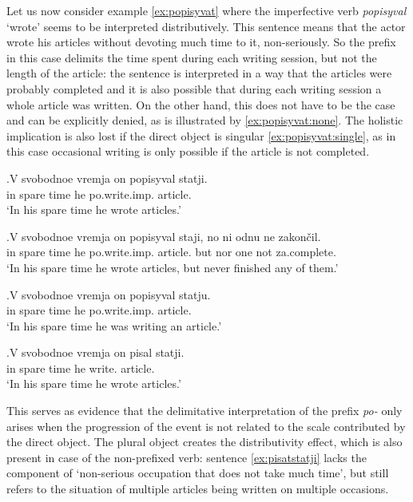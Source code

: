 Let us now consider example \ref{ex:popisyvat} where the imperfective verb  \textit{popisyval} `wrote' seems to be interpreted distributively. This sentence means that the actor wrote his articles without devoting much time to it, non-seriously. So the prefix in this case delimits the time spent during each writing session, but not the length of the article: the sentence is interpreted in a way that the articles were probably completed and it is also possible that during each writing session a whole article was written. On the other hand, this does not have to be the case and can be explicitly denied, as is illustrated by \ref{ex:popisyvat:none}. The holistic implication is also lost if the direct object is singular \ref{ex:popisyvat:single}, as in this case occasional writing is only possible if the article is not completed. 

\exg.\label{ex:popisyvat}V svobodnoe vremja on popisyval statji.\\
in spare time he po.write.imp. article.\\
\trans `In his spare time he wrote articles.'

\exg.\label{ex:popisyvat:none}V svobodnoe vremja on popisyval staji, no ni odnu ne zakon\v{c}il.\\
in spare time he po.write.imp. article. but nor one not za.complete.\\
\trans `In his spare time he wrote articles, but never finished any of them.'

\exg.\label{ex:popisyvat:single}V svobodnoe vremja on popisyval statju.\\
in spare time he po.write.imp. article.\\
\trans `In his spare time he was writing an article.'

\exg.\label{ex:pisatstatji}V svobodnoe vremja on pisal statji.\\
in spare time he write. article.\\
\trans `In his spare time he wrote articles.'

This serves as evidence that the delimitative  interpretation of the prefix \textit{po-}   only arises when the progression of the event is not related to the scale contributed by the direct object. The plural object creates the distributivity effect, which is also present in case of the non-prefixed verb: sentence \ref{ex:pisatstatji} lacks the component of `non-serious occupation that does not take much time', but still refers to the situation of multiple articles being written on multiple occasions. 

